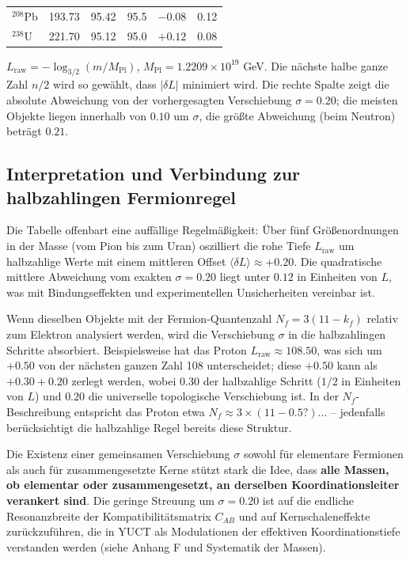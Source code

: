 \documentclass[12pt,a4paper]{article}
\begin{document}
\begin{table}[htbp]
\begin{tabular}{l c c c c c}
			\(^{208}\)Pb & 193.73 & 95.42  & 95.5  & \(-0.08\) & 0.12 \\
			\(^{238}\)U & 221.70 & 95.12  & 95.0  & \(+0.12\) & 0.08 \\
			\bottomrule
		\end{tabular}
		\par\smallskip
		\footnotesize
		\(L_{\mathrm{raw}} = -\log_{3/2}(m/M_{\mathrm{Pl}})\), \(M_{\mathrm{Pl}} = 1.2209\times10^{19}\) GeV. Die nächste halbe ganze Zahl \(n/2\) wird so gewählt, dass \(|\delta L|\) minimiert wird. Die rechte Spalte zeigt die absolute Abweichung von der vorhergesagten Verschiebung \(\sigma = 0.20\); die meisten Objekte liegen innerhalb von \(0.10\) um \(\sigma\), die größte Abweichung (beim Neutron) beträgt \(0.21\).
	\end{table}
	
	\subsection{Interpretation und Verbindung zur halbzahlingen Fermionregel}
	
	Die Tabelle offenbart eine auffällige Regelmäßigkeit: Über fünf Größenordnungen in der Masse (vom Pion bis zum Uran) oszilliert die rohe Tiefe \(L_{\mathrm{raw}}\) um halbzahlige Werte mit einem mittleren Offset \(\langle \delta L \rangle \approx +0.20\). Die quadratische mittlere Abweichung vom exakten \(\sigma = 0.20\) liegt unter \(0.12\) in Einheiten von \(L\), was mit Bindungseffekten und experimentellen Unsicherheiten vereinbar ist.
	
	Wenn dieselben Objekte mit der Fermion-Quantenzahl \(N_f = 3(11 - k_f)\) relativ zum Elektron analysiert werden, wird die Verschiebung \(\sigma\) in die halbzahlingen Schritte absorbiert. Beispielsweise hat das Proton \(L_{\mathrm{raw}} \approx 108.50\), was sich um \(+0.50\) von der nächsten ganzen Zahl 108 unterscheidet; diese \(+0.50\) kann als \(+0.30 + 0.20\) zerlegt werden, wobei \(0.30\) der halbzahlige Schritt (\(1/2\) in Einheiten von \(L\)) und \(0.20\) die universelle topologische Verschiebung ist. In der \(N_f\)-Beschreibung entspricht das Proton etwa \(N_f \approx 3 \times (11 - 0.5?) \dots\) – jedenfalls berücksichtigt die halbzahlige Regel bereits diese Struktur.
	
	Die Existenz einer gemeinsamen Verschiebung \(\sigma\) sowohl für elementare Fermionen als auch für zusammengesetzte Kerne stützt stark die Idee, dass \textbf{alle Massen, ob elementar oder zusammengesetzt, an derselben Koordinationsleiter verankert sind}. Die geringe Streuung um \(\sigma=0.20\) ist auf die endliche Resonanzbreite der Kompatibilitätsmatrix \(C_{AB}\) und auf Kernschaleneffekte zurückzuführen, die in YUCT als Modulationen der effektiven Koordinationstiefe verstanden werden (siehe Anhang F und Systematik der Massen).
	
\end{document}
